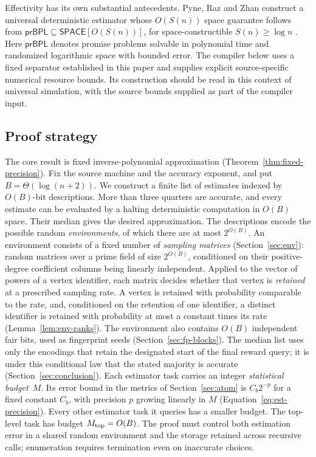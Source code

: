 Effectivity has its own substantial antecedents.
Pyne, Raz and Zhan construct a universal deterministic estimator whose
$O(S(n))$ space guarantee follows from
$\mathsf{prBPL}\subseteq\mathsf{SPACE}[O(S(n))]$, for
space-constructible $S(n)\ge\log n$
\cite[full version, Theorem~5.1]{PyneRazZhan2023}.
Here $\mathsf{prBPL}$ denotes promise problems solvable in polynomial
time and randomized logarithmic space with bounded error.
The compiler below uses a fixed separator established in this paper
and supplies explicit source-specific numerical resource bounds.
Its construction should be read in this context of universal
simulation, with the source bounds supplied as part of the compiler input.

\subsection{Proof strategy}

The core result is fixed inverse-polynomial approximation
(Theorem~\ref{thm:fixed-precision}). Fix the source machine and the
accuracy exponent, and put $B=\Theta(\log(n+2))$. We construct a finite
list of estimates indexed by $O(B)$-bit descriptions. More than three
quarters are accurate, and every estimate can be evaluated by a halting
deterministic computation in $O(B)$ space. Their median gives the desired
approximation. The descriptions encode the possible random
\emph{environments}, of which there are at most $2^{O(B)}$. An environment
consists of a fixed number of \emph{sampling matrices}
(Section~\ref{sec:env}): random matrices over a prime field of size
$2^{O(B)}$, conditioned on their positive-degree coefficient columns
being linearly independent. Applied to the vector of powers of a vertex
identifier, each matrix decides whether that vertex is \emph{retained}
at a prescribed sampling rate. A vertex is retained with probability
comparable to the rate, and, conditioned on the retention of one
identifier, a distinct identifier is retained with probability at most
a constant times its rate (Lemma~\ref{lem:env-ranks}). The environment
also contains $O(B)$ independent fair bits, used as fingerprint seeds
(Section~\ref{sec:fp-blocks}). The median list uses only the encodings
that retain the designated start of the final reward query; it is under
this conditional law that the stated majority is accurate
(Section~\ref{sec:conclusion}). Each estimator task carries an integer
\emph{statistical budget}~$M$. Its error bound in the metrics of
Section~\ref{sec:atom} is $C_b2^{-p}$ for a fixed constant $C_b$, with
precision $p$ growing linearly in $M$
(Equation~\eqref{eq:est-precision}). Every other
estimator task it queries has a smaller budget. The top-level task has
budget $M_{\rm top}=O(B)$. The proof must control both estimation error in a shared
random environment and the storage retained across recursive calls;
enumeration requires termination even on inaccurate choices.

